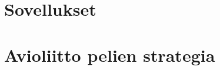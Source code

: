\documentclass[finnish]{tktltiki2}
\theoremstyle{definition}
\theoremstyle{remark}
\begin{document}
\section{Sovellukset}

\section{Avioliitto pelien strategia}

 

%
%
 
%

%


\lastpage
\end{document}
